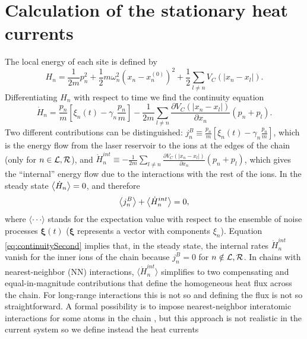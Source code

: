 \section{Calculation of the stationary heat currents\label{sec:HeatFlow}}
%
%
The local energy of each site is defined by
%
\begin{equation}
    H_n = \frac{1}{2m} p_n^2 + \frac{1}{2}m\omega_n^2 \left( x_n - x_n^{(0)}\right)^2 +\frac{1}{2}\sum_{l\neq n} V_C(\left|x_n-x_l\right|).
    \label{eq:LocalEnergy}
\end{equation}
%
Differentiating $H_n$ with respect to time we find the continuity  equation
%
\begin{equation}
    \dot{H}_n = \frac{p_n}{m}\! \left[ \xi_n(t)-\gamma_n \frac{p_n}{m} \right]\! - \frac{1}{2m}\!\sum_{l\neq n}\frac{\partial V_C (\left|x_n\!-\!x_l\right|)}{\partial x_n}(p_n + p_l).
    \label{eq:continuityFirst}
\end{equation}
%
Two different contributions can be distinguished: $j^B_n \equiv \frac{p_n}{m} \left[ \xi_n(t)-\gamma_n \frac{p_n}{m} \right]$, which is the energy flow from the laser reservoir to the ions at the edges of the chain (only for $n\in {\cal L}, {\cal R}$), and $\dot{H}_n^{int} \equiv - \frac{1}{2m}\sum_{l\neq n}\frac{\partial V_C (\left|x_n-x_l\right|)}{\partial x_n}(p_n + p_l)$, which gives the ``internal'' energy flow due to the interactions with the rest of the ions. In the steady state $\expval{\dot{H}_n} = 0$, and therefore
%
\begin{equation}
    \expval{j^B_n} + \expval{\dot{H}_n^{int}} = 0,
    \label{eq:continuitySecond}
\end{equation}
%
where $\langle \cdot\!\cdot\!\cdot \rangle$ stands for the expectation value with respect to  the ensemble of noise processes $\bm\xi (t)$ ($\bm\xi$ represents a vector with
components $\xi_n$). Equation \eqref{eq:continuitySecond} implies that, in the steady state, the internal rates $\dot{H}_n^{int}$ vanish for the inner ions of the chain because $j^B_n = 0$ for $n\notin {\cal L},{\cal R}$. In chains with nearest-neighbor (NN) interactions,
$\langle\dot{H}_n^{int}\rangle$ simplifies to two compensating and equal-in-magnitude contributions that define the homogeneous heat flux across the chain.
For long-range interactions this is not so and defining the flux is not so straightforward. A formal possibility is to impose
nearest-neighbor interatomic interactions for some atoms in the chain \cite{Chen2015},
but this approach is not realistic in the current system so we define instead the heat currents

